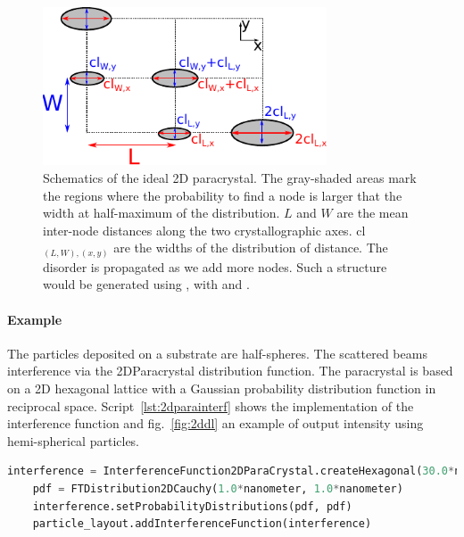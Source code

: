 \begin{figure}[ht]
\begin{center}
\includegraphics[width=0.75\textwidth]{fig/drawing/drawing2Dparacrystal.pdf}
\end{center}
\caption{Schematics of the ideal 2D paracrystal. The gray-shaded areas mark the regions where the probability to find a node is larger that the width at half-maximum of the distribution. $L$ and  $W$ are the mean inter-node distances along the two crystallographic axes. cl$_{(L,W),(x,y)}$ are the widths of the distribution of distance. The disorder is propagated as we add more nodes. Such a structure would be generated using , with  and  .}
\label{fig:2dparaschematic}
\end{figure}


\paragraph{Example} The particles deposited on a substrate are half-spheres. The scattered beams interference via the 2DParacrystal distribution function. The paracrystal is based on a 2D hexagonal lattice with a Gaussian probability distribution function in reciprocal space.  Script~\ref{lst:2dparainterf} shows the implementation of the interference function and fig.~\ref{fig:2ddl} an example of output intensity using hemi-spherical particles.

\begin{lstlisting}[language=python, style=eclipseboxed,numbers=none,nolol,caption={\Code{Python} script to define a "2DParacrystal" interference function between particles forming an hexagonal monolayer. },label={lst:2dparainterf}]
    interference = InterferenceFunction2DParaCrystal.createHexagonal(30.0*nanometer,0.0, 40.0*micrometer, 40.0*micrometer)|
    pdf = FTDistribution2DCauchy(1.0*nanometer, 1.0*nanometer)
    interference.setProbabilityDistributions(pdf, pdf)
    particle_layout.addInterferenceFunction(interference)
\end{lstlisting}

